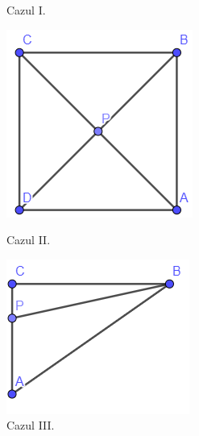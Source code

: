 \documentclass[12pt]{article}
\begin{document}
\begin{figure}[!htb]
\begin{minipage}{0.24\textwidth}
		\caption{Cazul I.}\label{fig:fig13}
	\end{minipage}\hfill
        \begin{minipage}{0.24\textwidth}
		\centering
		\includegraphics[width=.95\linewidth]{cazii.png}
		\caption{Cazul II.}\label{fig:fig14}
	\end{minipage}\hfill
	\begin{minipage}{0.24\textwidth}
		\centering
		\includegraphics[width=.95\linewidth]{caziii.png}
		\caption{Cazul III.}\label{fig:fig15}
	\end{minipage}\hfill
\end{figure}
\end{document}
